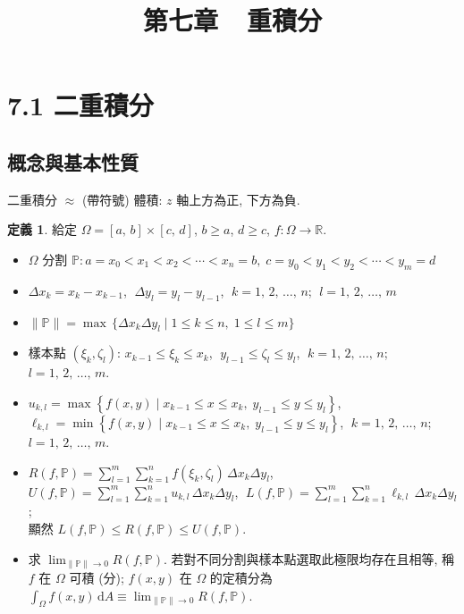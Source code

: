 \documentclass[12pt]{extarticle}
\newcommand{\ds}{\displaystyle}
\theoremstyle{definition}
\newtheorem*{dfn}{定義}
\begin{document}
\title{\texorpdfstring{\vspace{-16mm} 第七章\ \ 重積分}{第七章\ \ 重積分}} 
\author{\vspace{-5em}}
\date{\vspace{-5em}}
\maketitle
\thispagestyle{firststyle}

\section*{7.1 二重積分}

\subsection*{概念與基本性質}

二重積分 $\approx$  (帶符號) 體積: $z$ 軸上方為正, 下方為負. 

\begin{dfn}
  給定 $\Omega = [a,\,b]\times[c,\,d]$, $b\geqslant a$, $d\geqslant c$, $f:\Omega\to\mathbb{R}$. 
  \begin{itemize}\setlength{\itemsep}{0pt}
    \item $\Omega$ 分割 $\ds\mathbb{P}: a = x_0 < x_1 < x_2 < \cdots < x_n = b,\;c = y_0 < y_1 < y_2 < \cdots < y_m = d$
    \item $\ds\Delta x_k = x_k - x_{k-1}$,$\;$ $\ds\Delta y_l = y_l - y_{l - 1}$,$\;$ $k = 1,\,2,\,\ldots,\,n$;$\;$ $l = 1,\,2,\,\ldots,\,m$
    \item $\ds\|\mathbb{P}\| = \max\,\{\Delta x_k\Delta y_l\;|\;1\leqslant k\leqslant n,\;1\leqslant l\leqslant m\}$
    \item 樣本點 $\ds(\xi_k,\zeta_l)$: $\ds x_{k - 1} \leqslant \xi_k \leqslant x_k$,$\;$ $\ds y_{l - 1} \leqslant \zeta_l \leqslant y_l$,$\;$ $k = 1,\,2,\,\ldots,\,n$;$\;$ $l=1,\,2,\,\ldots,\,m$.
    \item $\ds u_{k,l} = \max\left\{f(x,y)\;|\;x_{k-1}\leqslant x\leqslant x_k,\;y_{l-1}\leqslant y\leqslant y_l\right\}$,$\;$ $\ell_{k, l} = \min\left\{f(x,y)\;|\;x_{k-1}\leqslant x\leqslant x_k,\;y_{l-1}\leqslant y\leqslant y_l\right\}$,$\;$ $k=1,\,2,\,\ldots,\,n$;$\;$ $l=1,\,2,\,\ldots,\,m$.
    \item $\ds R(f,\mathbb{P}) = \sum_{l=1}^m\sum_{k=1}^n f(\xi_k,\zeta_l)\,\Delta x_k\Delta y_l$,$\;$ $\ds U(f,\mathbb{P}) = \sum_{l=1}^m\sum_{k=1}^n u_{k,l}\,\Delta x_k\Delta y_l$,$\;$ $\ds L(f,\mathbb{P}) = \sum_{l=1}^m\sum_{k=1}^n \ell_{k, l}\,\Delta x_k\Delta y_l$; \\顯然 $\ds L(f,\mathbb{P})\leqslant R(f,\mathbb{P})\leqslant U(f, \mathbb{P})$. 
    \item 求 $\ds\lim_{\|\mathbb{P}\|\to 0} R(f,\mathbb{P})$. 若對不同分割與樣本點選取此極限均存在且相等, 稱 $f$ 在 $\Omega$ 可積 (分); $f(x, y)$ 在 $\Omega$ 的定積分為 $\ds\int_\Omega f(x, y)\,\mathrm{d}A \equiv \lim_{\|\mathbb{P}\|\to 0} R(f,\mathbb{P})$.
  \end{itemize}
\end{dfn}
\end{document}

